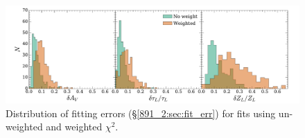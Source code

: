 
\begin{figure}[t]
  \centering
  \includegraphics[width=\textwidth]{891_2/figs/weight_comp_hist.pdf}
  \caption[Comparison of uncertainties between weighted and unweighted
    fits]{\fixspacing\label{891_2:fig:weight_comp}
    Distribution of fitting errors (\S\ref{891_2:sec:fit_err}) for fits
    using un-weighted and weighted $\chi^2$.}
\end{figure}




